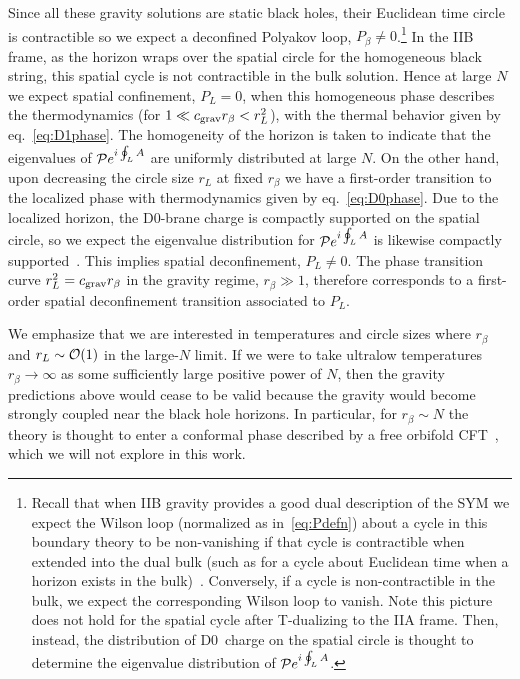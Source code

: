 Since all these gravity solutions are static black holes, their Euclidean time circle is contractible so we expect a deconfined Polyakov loop, $P_{\beta} \ne 0$.\footnote{Recall that when IIB gravity provides a good dual description of the SYM we expect the Wilson loop (normalized as in~\eqref{eq:Pdefn}) about a cycle in this boundary theory to be non-vanishing if that cycle is contractible when extended into the dual bulk (such as for a cycle about Euclidean time when a horizon exists in the bulk)~\cite{Maldacena:1998im, Witten:1998zw, Aharony:2003sx}.  Conversely, if a cycle is non-contractible in the bulk, we expect the corresponding Wilson loop to vanish.  Note this picture does not hold for the spatial cycle after T-dualizing to the IIA frame.  Then, instead, the distribution of D0~charge on the spatial circle is thought to determine the eigenvalue distribution of $\mathcal P e^{i\oint_L A}$.}
In the IIB frame, as the horizon wraps over the spatial circle for the homogeneous black string, this spatial cycle is not contractible in the bulk solution.
Hence at large $N$ we expect spatial confinement, $P_L = 0$, when this homogeneous phase describes the thermodynamics (for $1 \ll c_{\text{grav}} r_{\beta} < r_L^2$), with the thermal behavior given by eq.~\eqref{eq:D1phase}.
The homogeneity of the horizon is taken to indicate that the eigenvalues of $\mathcal P e^{i\oint_L A}$ are uniformly distributed at large $N$.
On the other hand, upon decreasing the circle size $r_L$ at fixed $r_{\beta}$ we have a first-order transition to the localized phase with thermodynamics given by eq.~\eqref{eq:D0phase}.
Due to the localized horizon, the D0-brane charge is compactly supported on the spatial circle, so we expect the eigenvalue distribution for $\mathcal P e^{i\oint_L A}$ is likewise compactly supported~\cite{Kol:2002xz, Aharony:2004ig}.
This implies spatial deconfinement, $P_L \ne 0$.
The phase transition curve $r_L^2 = c_{\text{grav}} r_{\beta}$ in the gravity regime, $r_{\beta} \gg 1$, therefore corresponds to a first-order spatial deconfinement transition associated to $P_L$.

We emphasize that we are interested in temperatures and circle sizes where $r_{\beta}$ and $r_L \sim \mathcal O(1)$ in the large-$N$ limit.
If we were to take ultralow temperatures $r_{\beta} \to \infty$ as some sufficiently large positive power of $N$, then the gravity predictions above would cease to be valid because the gravity would become strongly coupled near the black hole horizons.
In particular, for $r_{\beta} \sim N$ the theory is thought to enter a conformal phase described by a free orbifold CFT~\cite{Itzhaki:1998dd, Aharony:1999ti}, which we will not explore in this work.

